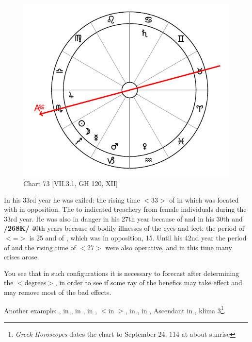 \begin{figure}
\centering
\vspace{-20pt}
\includegraphics[width=.68\textwidth]{charts/7_3_1}
\caption{Chart 73 [VII.3.1, GH 120, XII]}
\label{fig:chart73}
\end{figure}

In his 33rd year he was exiled: the rising time $<$33$>$ of \Cancer\xspace in which \Saturn\xspace was located with \Mars\xspace in opposition. The \Moon\xspace \Sextile\xspace to
\Venus\xspace indicated treachery from female individuals during the 33rd year. He was also in danger in his 27th year because of \Capricorn\xspace and in his 30th and \textbf{/268K/} 40th years because of bodily illnesses of the eyes and feet: the period of \Cancer $<$=\Moon$>$ is 25 and of \Mars, which was in opposition, 15. Until his 42nd year the period of \Mars\xspace and the rising time of \Capricorn\xspace $<$27$>$ were also operative, and in this time many crises arose. 

You see that in such configurations it is necessary to forecast after determining the $<$degrees$>$, in order to see if some ray of the benefics may take effect and may remove most of the bad effects.

\newpage
Another example: \Sun, \Venus\xspace in \Libra, \Saturn\xspace in \Aries, \Jupiter\xspace in \Taurus, \Mars\xspace $<$in \Libra$>$, \Mercury\xspace in \Virgo, \Moon\xspace in \Sagittarius, Ascendant in \Libra, klima 3\footnote{\textit{Greek Horoscopes} dates the chart to September 24, 114 at about sunrise}. 

